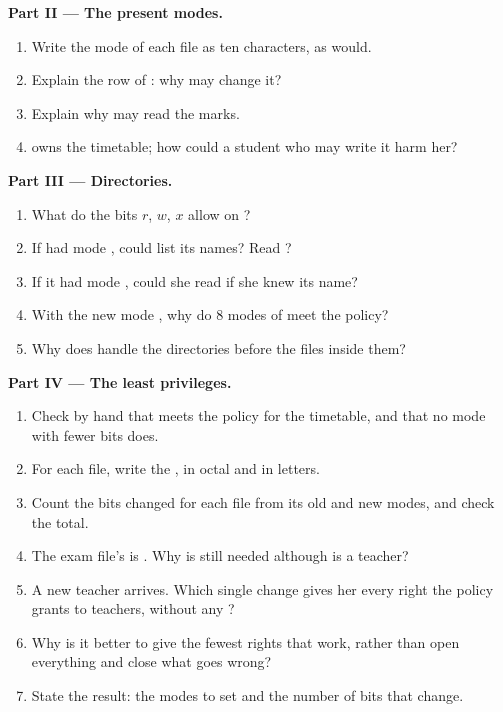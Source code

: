 \begin{problem}
\medskip\noindent\textbf{Part II --- The present modes.}
\begin{enumerate}[resume]
  \item Write the mode of each file as ten characters, as  would.
  \item Explain the row of : why may  change it?
  \item Explain why  may read the marks.
  \item {} owns the timetable; how could a student who may write it harm her?
\end{enumerate}

\medskip\noindent\textbf{Part III --- Directories.}
\begin{enumerate}[resume]
  \item What do the bits $r$, $w$, $x$ allow on ?
  \item If  had mode , could  list its names? Read ?
  \item If it had mode , could she read  if she knew its name?
  \item With the new mode , why do $8$ modes of  meet the policy?
  \item Why does  handle the directories before the files inside them?
\end{enumerate}

\medskip\noindent\textbf{Part IV --- The least privileges.}
\begin{enumerate}[resume]
  \item Check by hand that  meets the policy for the timetable, and that no mode with fewer bits does.
  \item For each file, write the  , in octal and in letters.
  \item Count the bits changed for each file from its old and new modes, and check the total.
  \item The exam file's  is . Why is  still needed although  is a teacher?
  \item A new teacher arrives. Which single change gives her every right the policy grants to teachers, without any ?
  \item Why is it better to give the fewest rights that work, rather than open everything and close what goes wrong?
  \item State the result: the modes to set and the number of  bits that change.
\end{enumerate}
\end{problem}
